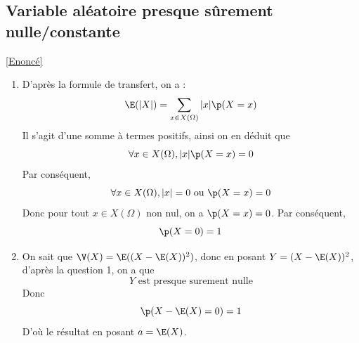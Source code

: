 \documentclass[8pt]{book}
\begin{document}
	\subsection{Variable aléatoire presque sûrement nulle/constante}
	\label{Variable aléatoire presque sûrement nulle/constante corrigé}
	\textcolor{blue}{\hyperref[Variable aléatoire presque sûrement nulle/constante]{[Enoncé]}}\\
	\begin{enumerate}[leftmargin=*]
		\item D'après la formule de transfert, on a : \[\E(|X|)=\sum_{x\in X(\Omega)}|x|\p(X=x)\]
		Il s'agit d'une somme à termes positifs, ainsi on en déduit que \[\forall x\in X(\Omega), |x|\p(X=x)=0\]
		Par conséquent, \[\forall x\in X(\Omega), |x|=0 \text{ ou } \p(X=x)=0\]
		Donc pour tout $x\in X(\Omega)$ non nul, on a $\p(X=x)=0$.
		Par conséquent, \[\p(X=0)=1\] 
		\item On sait que $\V(X)=\E((X-\E(X))^2)$, donc en posant $Y=(X-\E(X))^2$, d'après la question 1, on a que \[Y \text{ est presque surement nulle}\]
		Donc \[\p(X-\E(X)=0)=1\]
		D'où le résultat en posant $a=\E(X)$.
	\end{enumerate}
\end{document}
